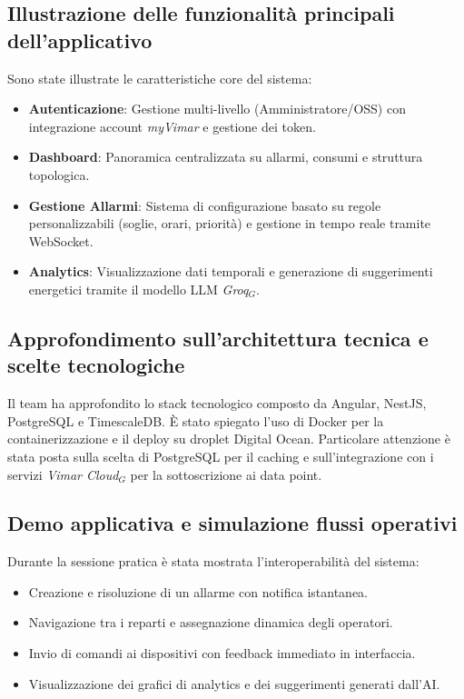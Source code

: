 \documentclass[10pt, letterpaper]{article}
\begin{document}
\subsection*{Illustrazione delle funzionalità principali dell'applicativo}
Sono state illustrate le caratteristiche core del sistema:
\begin{itemize}
    \item \textbf{Autenticazione}: Gestione multi-livello (Amministratore/OSS) con integrazione account \textit{myVimar} e gestione dei token.
    \item \textbf{Dashboard}: Panoramica centralizzata su allarmi, consumi e struttura topologica.
    \item \textbf{Gestione Allarmi}: Sistema di configurazione basato su regole personalizzabili (soglie, orari, priorità) e gestione in tempo reale tramite WebSocket.
    \item \textbf{Analytics}: Visualizzazione dati temporali e generazione di suggerimenti energetici tramite il modello LLM \textit{Groq$_G$}.
\end{itemize}

\subsection*{Approfondimento sull'architettura tecnica e scelte tecnologiche}
Il team ha approfondito lo stack tecnologico composto da Angular, NestJS, PostgreSQL e TimescaleDB. È stato spiegato l'uso di Docker per la containerizzazione e il deploy su droplet Digital Ocean. Particolare attenzione è stata posta sulla scelta di PostgreSQL per il caching e sull'integrazione con i servizi \textit{Vimar Cloud$_G$} per la sottoscrizione ai data point.

\subsection*{Demo applicativa e simulazione flussi operativi}
Durante la sessione pratica è stata mostrata l'interoperabilità del sistema:
\begin{itemize}
    \item Creazione e risoluzione di un allarme con notifica istantanea.
    \item Navigazione tra i reparti e assegnazione dinamica degli operatori.
    \item Invio di comandi ai dispositivi con feedback immediato in interfaccia.
    \item Visualizzazione dei grafici di analytics e dei suggerimenti generati dall'AI.
\end{itemize}
\end{document}
